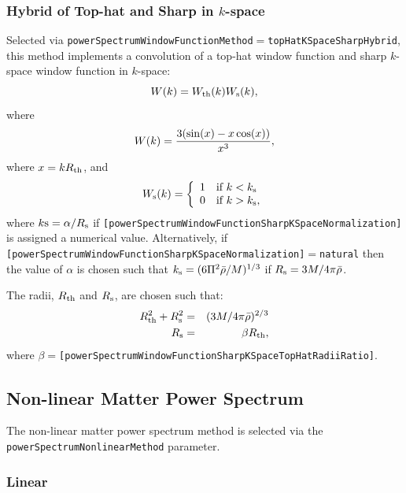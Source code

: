 \subsubsection{Hybrid of Top-hat and Sharp in $k$-space}

Selected via {\tt powerSpectrumWindowFunctionMethod}$=${\tt topHatKSpaceSharpHybrid}, this method implements a convolution of a top-hat window function and sharp $k$-space window function in $k$-space:
\begin{equation}
 W(k) = W_{\rm th}(k) W_{\rm s}(k),
\end{equation}
where
\begin{equation}
 W(k) = {3 (\sin(x)-x \cos(x)) \over x^3},
\end{equation}
where $x = k R_{\rm th}$, and
\begin{equation}
 W_{\rm s}(k) = \left\{ \begin{array}{ll} 1 & \hbox{if } k < k_{\rm s} \\ 0 & \hbox{if } k > k_{\rm s}, \end{array} \right.
\end{equation}
where $k{\rm s} = \alpha / R_{\rm s}$ if {\tt [powerSpectrumWindowFunctionSharpKSpaceNormalization]} is assigned a numerical value. Alternatively, if {\tt [powerSpectrumWindowFunctionSharpKSpaceNormalization]}$=${\tt natural} then the value of $\alpha$ is chosen such that $k_{\rm s} = (6 \Pi^2 \bar{\rho}/M)^{1/3}$ if $R_{\rm s}=3M/4\pi\bar{\rho}$.

The radii, $R_{\rm th}$ and $R_{\rm s}$, are chosen such that:
\begin{eqnarray}
R_{\rm th}^2 + R_{\rm s}^2 &=& (3M/4\pi\bar{\rho})^{2/3} \\
R_{\rm s} &=& \beta R_{\rm th},
\end{eqnarray}
where $\beta=${\tt [powerSpectrumWindowFunctionSharpKSpaceTopHatRadiiRatio]}.

\subsection{Non-linear Matter Power Spectrum}

The non-linear matter power spectrum method is selected via the {\tt powerSpectrumNonlinearMethod} parameter.

\subsubsection{Linear}

